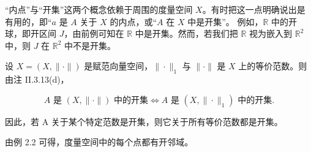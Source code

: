 \begin{remark}

\begin{items}
\item

“内点”与“开集”这两个概念依赖于周围的度量空间 $X$。有时把这一点明确说出是有用的，即“$a$ 是 $A$ 关于 $X$ 的内点，或“$A$ 在 $X$ 中是开集”。
例如，$\mathbb{R}$ 中的开球，即开区间 $J$，由前例可知在 $\mathbb{R}$ 中是开集。然而，若我们把 $\mathbb{R}$ 视为嵌入到 $\mathbb{R}^2$ 中，则 $J$ 在 $\mathbb{R}^2$ 中不是开集。

\item

设 $ X = (X, \|\cdot\|) $ 是赋范向量空间，$ \|\cdot\|_1 $ 与 $ \|\cdot\| $ 是 $ X $ 上的等价范数。则由注 II.3.13(d)，

\[
A\text{ 是 }(X,\|\cdot\|)\text{ 中的开集}\Longleftrightarrow A\text{ 是 }(X,\|\cdot\|_{1})\text{ 中的开集}.
\]

因此，若 A 关于某个特定范数是开集，则它关于所有等价范数都是开集。

\item

由例 2.2 可得，度量空间中的每个点都有开邻域。

\end{items}

\end{remark}

